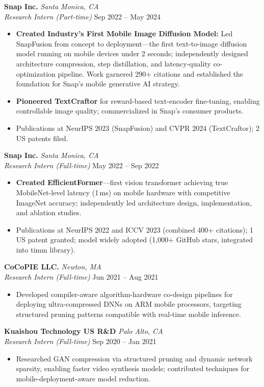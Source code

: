 \documentclass[11pt,letterpaper]{article}
\newcommand{\cventry}[4]{%
    \noindent\textbf{#1} \hfill \textit{#2} \\
    \textit{#3} \hfill #4 \\[4pt]
}
\begin{document}
\cventry{Snap Inc.}{Santa Monica, CA}{Research Intern (Part-time)}{Sep 2022 -- May 2024}
\begin{itemize}
    \item \textbf{Created Industry's First Mobile Image Diffusion Model:} Led SnapFusion from concept to deployment---the first text-to-image diffusion model running on mobile devices under 2 seconds; independently designed architecture compression, step distillation, and latency-quality co-optimization pipeline. Work garnered 290+ citations and established the foundation for Snap's mobile generative AI strategy.
    \item \textbf{Pioneered TextCraftor} for reward-based text-encoder fine-tuning, enabling controllable image quality; commercialized in Snap's consumer products.
    \item Publications at NeurIPS 2023 (SnapFusion) and CVPR 2024 (TextCraftor); 2 US patents filed.
\end{itemize}

\cventry{Snap Inc.}{Santa Monica, CA}{Research Intern (Full-time)}{May 2022 -- Sep 2022}
\begin{itemize}
    \item \textbf{Created EfficientFormer}---first vision transformer achieving true MobileNet-level latency (1\,ms) on mobile hardware with competitive ImageNet accuracy; independently led architecture design, implementation, and ablation studies.
    \item Publications at NeurIPS 2022 and ICCV 2023 (combined 400+ citations); 1 US patent granted; model widely adopted (1,000+ GitHub stars, integrated into timm library).
\end{itemize}

\cventry{CoCoPIE LLC.}{Newton, MA}{Research Intern (Full-time)}{Jun 2021 -- Aug 2021}
\begin{itemize}
    \item Developed compiler-aware algorithm-hardware co-design pipelines for deploying ultra-compressed DNNs on ARM mobile processors, targeting structured pruning patterns compatible with real-time mobile inference.
\end{itemize}

\cventry{Kuaishou Technology US R\&D}{Palo Alto, CA}{Research Intern (Full-time)}{Sep 2020 -- Jan 2021}
\begin{itemize}
    \item Researched GAN compression via structured pruning and dynamic network sparsity, enabling faster video synthesis models; contributed techniques for mobile-deployment-aware model reduction.
\end{itemize}
\end{document}
